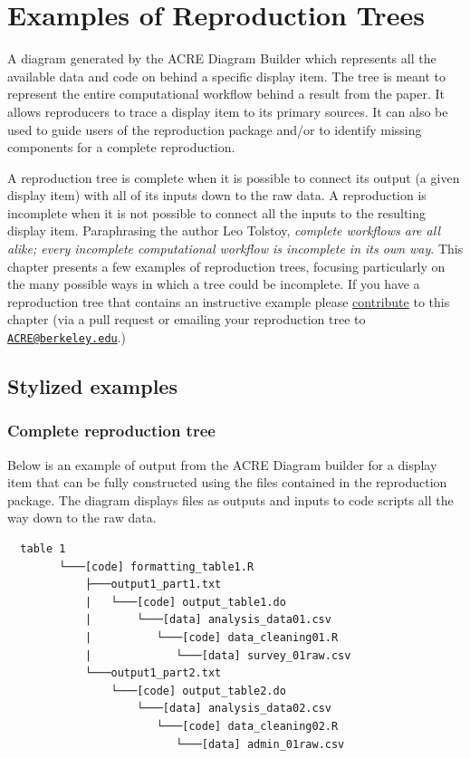 \documentclass[]{book}
\begin{document}
\hypertarget{examples-of-reproduction-trees}{%
\chapter{Examples of Reproduction Trees}\label{examples-of-reproduction-trees}}

A diagram generated by the ACRE Diagram Builder which represents all the available data and code on behind a specific display item. The tree is meant to represent the entire computational workflow behind a result from the paper. It allows reproducers to trace a display item to its primary sources. It can also be used to guide users of the reproduction package and/or to identify missing components for a complete reproduction.

A reproduction tree is complete when it is possible to connect its output (a given display item) with all of its inputs down to the raw data. A reproduction is incomplete when it is not possible to connect all the inputs to the resulting display item. Paraphrasing the author Leo Tolstoy, \emph{complete workflows are all alike; every incomplete computational workflow is incomplete in its own way}. This chapter presents a few examples of reproduction trees, focusing particularly on the many possible ways in which a tree could be incomplete. If you have a reproduction tree that contains an instructive example please \protect\hyperlink{contrib-guide}{contribute} to this chapter (via a pull request or emailing your reproduction tree to \href{mailto:ACRE@berkeley.edu}{\nolinkurl{ACRE@berkeley.edu}}.)

\hypertarget{stylized-examples}{%
\section{Stylized examples}\label{stylized-examples}}

\hypertarget{complete-reproduction-tree}{%
\subsection{Complete reproduction tree}\label{complete-reproduction-tree}}

Below is an example of output from the ACRE Diagram builder for a display item that can be fully constructed using the files contained in the reproduction package. The diagram displays files as outputs and inputs to code scripts all the way down to the raw data.

\begin{verbatim}
  table 1
        └───[code] formatting_table1.R
            ├───output1_part1.txt  
            |   └───[code] output_table1.do           
            |       └───[data] analysis_data01.csv
            |          └───[code] data_cleaning01.R
            |             └───[data] survey_01raw.csv
            └───output1_part2.txt  
                └───[code] output_table2.do           
                    └───[data] analysis_data02.csv
                       └───[code] data_cleaning02.R
                          └───[data] admin_01raw.csv  
\end{verbatim}
\end{document}
